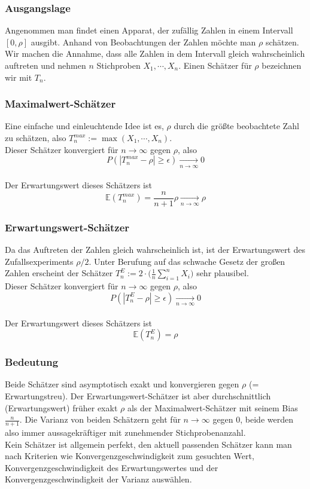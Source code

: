 \documentclass[a4paper]{article}
\begin{document}
\subsubsection{Ausgangslage}
Angenommen man findet einen Apparat, der zufällig Zahlen in einem Intervall $[0, \rho]$ ausgibt. Anhand von Beobachtungen der Zahlen möchte man $\rho$ schätzen. Wir machen die Annahme, dass alle Zahlen in dem Intervall gleich wahrscheinlich auftreten und  nehmen $n$ Stichproben $X_1, \cdots, X_n$. Einen Schätzer für $\rho$ bezeichnen wir mit $T_n$.

\subsubsection{Maximalwert-Schätzer}
Eine einfache und einleuchtende Idee ist es, $\rho$ durch die größte beobachtete Zahl zu schätzen, also
$T_n^{max} := \max(X_1, \cdots, X_n)$.\\
Dieser Schätzer konvergiert für $n \to \infty$ gegen $\rho$, also $$P(| T_n^{max} - \rho | \geq \epsilon) \underset{n \to \infty}{\longrightarrow} 0$$\\
Der Erwartungswert dieses Schätzers ist $$ \mathbb{E}(T_n^{max} ) = \frac{n}{n+1} \rho    \underset{n \to \infty}{\longrightarrow} \rho$$


\subsubsection{Erwartungswert-Schätzer}
Da das Auftreten der Zahlen gleich wahrscheinlich ist, ist der Erwartungswert des Zufallsexperiments $\rho /2$. Unter Berufung auf das  schwache Gesetz der großen Zahlen erscheint der Schätzer
$T_n^{E} :=  2 \cdot \biggl( \frac{1}{n} \sum_{i=1}^n X_i \biggr)$ sehr plausibel.\\
Dieser Schätzer konvergiert für $n \to \infty$ gegen $\rho$, also $$P(| T_n^{E} - \rho | \geq \epsilon) \underset{n \to \infty}{\longrightarrow} 0$$\\
Der Erwartungswert dieses Schätzers ist $$ \mathbb{E}(T_n^{E} ) = \rho$$

\subsubsection{Bedeutung}
Beide Schätzer sind asymptotisch exakt und konvergieren gegen $\rho$ (= Erwartungstreu). Der Erwartungswert-Schätzer ist aber durchschnittlich (Erwartungswert) früher exakt $\rho$ als der Maximalwert-Schätzer mit seinem Bias $\frac{n}{n+1}$. Die Varianz von beiden Schätzern geht für $n \to \infty$ gegen 0, beide werden also immer aussagekräftiger mit zunehmender Stichprobenanzahl.\\
Kein Schätzer ist allgemein perfekt, den aktuell passenden Schätzer kann man nach Kriterien wie Konvergenzgeschwindigkeit zum gesuchten Wert, Konvergenzgeschwindigkeit des Erwartungswertes und der Konvergenzgeschwindigkeit der Varianz auswählen.
\end{document}
